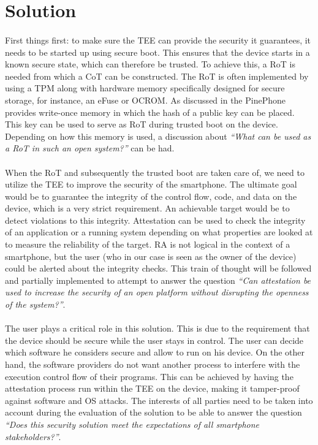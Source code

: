 \section{Solution}

\paragraph*{}
First things first: to make sure the TEE can provide the security it guarantees, it needs to be started up using secure boot. This ensures that the device starts in a known secure state, which can therefore be trusted. To achieve this, a RoT is needed from which a CoT can be constructed. The RoT is often implemented by using a TPM along with hardware memory specifically designed for secure storage, for instance, an eFuse or OCROM. As discussed in \cite{RoT} the PinePhone provides write-once memory in which the hash of a public key can be placed. This key can be used to serve as RoT during trusted boot on the device. Depending on how this memory is used, a discussion about \textit{\enquote{What can be used as a RoT in such an open system?}} can be had. 

\paragraph*{}
When the RoT and subsequently the trusted boot are taken care of, we need to utilize the TEE to improve the security of the smartphone. The ultimate goal would be to guarantee the integrity of the control flow, code, and data on the device, which is a very strict requirement. An achievable target would be to detect violations to this integrity. Attestation can be used to check the integrity of an application or a running system depending on what properties are looked at to measure the reliability of the target. RA is not logical in the context of a smartphone, but the user (who in our case is seen as the owner of the device) could be alerted about the integrity checks. This train of thought will be followed and partially implemented to attempt to answer the question \textit{\enquote{Can attestation be used to increase the security of an open platform without disrupting the openness of the system?}}.

\paragraph*{}
The user plays a critical role in this solution. This is due to the requirement that the device should be secure while the user stays in control. The user can decide which software he considers secure and allow to run on his device. On the other hand, the software providers do not want another process to interfere with the execution control flow of their programs. This can be achieved by having the attestation process run within the TEE on the device, making it tamper-proof against software and OS attacks. The interests of all parties need to be taken into account during the evaluation of the solution to be able to answer the question \textit{\enquote{Does this security solution meet the expectations of all smartphone stakeholders?}}. 

